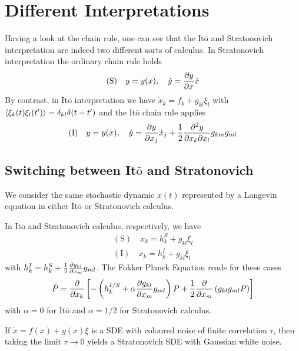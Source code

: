\documentclass{/home/ben/Templates/notebook}
\begin{document}
	\section{Different Interpretations}
	
	Having a look at the chain rule, one can see that the It$\bar{\mathrm{o}}$ and Stratonovich interpretation are indeed two different sorts of calculus. In Stratonovich interpretation the ordinary chain rule holds
	\begin{equation}
	\mathrm{(S)} \quad y = y(x), \quad \dot{y} = \pdv{y}{x} \dot{x}
	\end{equation}
	By contrast, in It$\bar{\mathrm{o}}$ interpretation we have $\dot{x}_k = f_k + g_{kl} \xi_l$ with $\expval{\xi_k(t) \xi_l(t')} = \delta_{kl} \delta(t-t')$ and the It$\bar{\mathrm{o}}$ chain rule applies
	\begin{equation}
	\mathrm{(I)} \quad y = y(x), \quad \dot{y} = \pdv{y}{x_j} \dot{x}_j + \frac{1}{2} \pdv[2]{y}{x_k}{x_l} g_{km} g_{ml}
	\end{equation}
	
	\subsection*{Switching between It$\bar{\mathrm{o}}$ and Stratonovich}
	
	We consider the same stochastic dynamic $x(t)$ represented by a Langevin equation in either It$\bar{\mathrm{o}}$ or Stratonovich calculus. 
	
	In It$\bar{\mathrm{o}}$ and Stratonovich calculus, respectively, we have
	\begin{gather*}
		\mathrm{(S)} \quad \dot{x}_k = h^S_k + g_{kl} \xi_l \\
		\mathrm{(I)} \quad \dot{x}_k = h^I_k + g_{kl} \xi_l
	\end{gather*}
	with $h^I_k = h^S_k + \frac{1}{2} \pdv{g_{kl}}{x_m} g_{ml}$. The Fokker Planck Equation reads for these cases
	\begin{equation}
	\dot{P} = \pdv{x_k} \left[ -\left( h^{I/S}_k + \alpha \pdv{g_{kl}}{x_m} g_{ml} \right) P + \frac{1}{2} \pdv{x_m} \left( g_{kl} g_{ml} P \right) \right]
	\end{equation}
	with $\alpha = 0$ for It$\bar{\mathrm{o}}$ and $\alpha = 1/2$ for Stratonovich calculus.
	
	\begin{theorem}
		If $\dot{x} = f(x) + g(x) \xi$ is a SDE with coloured noise of finite correlation $\tau$, then taking the limit $\tau \to 0$ yields a Stratonovich SDE with Gaussian white noise.
	\end{theorem}
	
\end{document}
